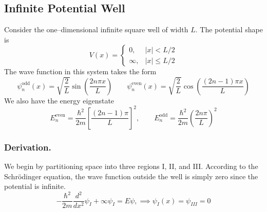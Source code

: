 \documentclass[../../../main.tex]{subfiles}
\begin{document}
\subsection{Infinite Potential Well}
Consider the one--dimensional infinite square well of width \(L\).
The potential shape is
\begin{equation*}
    V(x)=
    \begin{cases}
        0,      & |x|<L/2      \\
        \infty, & |x| \leq L/2
    \end{cases}
\end{equation*}
The wave function in this system takes the form 
\begin{equation*}
    \psi_n^{\text{odd}}(x) = \sqrt{\frac{2  }{L }} \sin\left(\frac{2 n \pi x}{L}\right)
    \qquad
    \psi_n^{\text{even}}(x) =\sqrt{\frac{2 }{L }} \cos\left(\frac{(2n-1)\pi x}{L}\right)
\end{equation*}
We also have the energy eigenstate
\begin{equation*}
    E_n^{\text{even}} = \frac{\hbar^2}{2 m} \left[\frac{(2n-1)\pi}{L}\right]^2, \qquad
    E_n^{\text{odd}} = \frac{\hbar^2}{2 m} \left(\frac{2 n \pi}{L}\right)^2
\end{equation*}

\subsubsection{Derivation.}
We begin by partitioning space into three regions I, II, and III.
According to the Schrödinger equation, the wave function outside the well is simply zero since the potential is infinite.
\begin{equation*}
    -\frac{\hbar^2 }{2m }\frac{d^2 }{dx^2 }\psi_I+\infty \psi_I=E\psi,\implies \psi_I(x)=\psi_{III}=0
\end{equation*}
\end{document}
